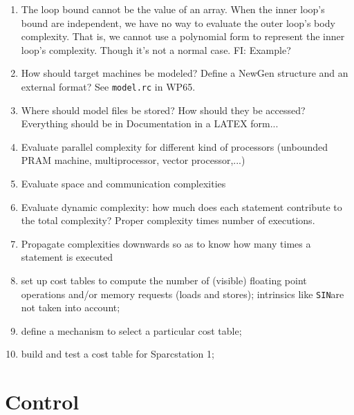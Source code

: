 \begin{enumerate}

  \item The loop bound cannot be the value of an array.
        When the inner loop's bound are independent, we have no way to
        evaluate the outer loop's body complexity.
        That is, we cannot use a polynomial form to represent the inner
        loop's complexity. 
        Though it's not a normal case. FI: Example?

  \item How should target machines be modeled? Define a NewGen structure
        and an external format? See \verb+model.rc+ in WP65.

  \item Where should model files be stored? How
        should they be accessed? Everything should be in Documentation
        in a LATEX form...

  \item Evaluate parallel complexity for different kind of processors
        (unbounded PRAM machine, multiprocessor, vector processor,...)

  \item Evaluate space and communication complexities

  \item Evaluate dynamic complexity: how much does each statement contribute
        to the total complexity? Proper complexity times number of executions.

  \item Propagate complexities downwards so as to know how many times a
        statement is executed

  \item set up cost tables to compute the number of (visible) floating point
        operations and/or memory requests (loads and stores); intrinsics
        like \verb+SIN+are not taken into account;

  \item define a mechanism to select a particular cost table;

  \item build and test a cost table for Sparcstation 1;

\end{enumerate}

\section{Control}

